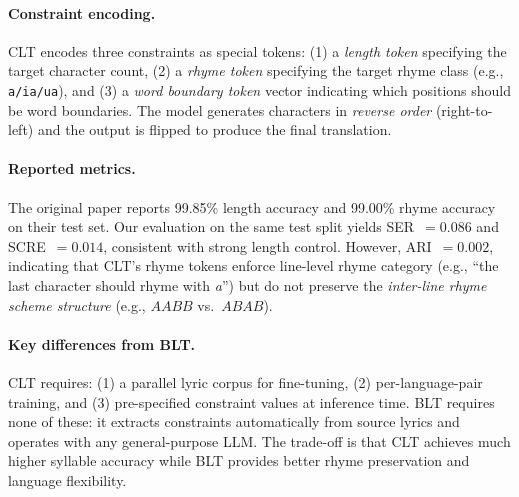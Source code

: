 \documentclass[11pt]{article}
\begin{document}
\paragraph{Constraint encoding.}
CLT encodes three constraints as special tokens: (1) a \emph{length token} specifying the target character count, (2) a \emph{rhyme token} specifying the target rhyme class (e.g., \texttt{a/ia/ua}), and (3) a \emph{word boundary token} vector indicating which positions should be word boundaries.
The model generates characters in \emph{reverse order} (right-to-left) and the output is flipped to produce the final translation.

\paragraph{Reported metrics.}
The original paper reports 99.85\% length accuracy and 99.00\% rhyme accuracy on their test set.
Our evaluation on the same test split yields SER~$= 0.086$ and SCRE~$= 0.014$, consistent with strong length control.
However, ARI~$= 0.002$, indicating that CLT's rhyme tokens enforce line-level rhyme category (e.g., ``the last character should rhyme with \textit{a}'') but do not preserve the \emph{inter-line rhyme scheme structure} (e.g., $AABB$ vs.\ $ABAB$).

\paragraph{Key differences from BLT.}
CLT requires: (1) a parallel lyric corpus for fine-tuning, (2) per-language-pair training, and (3) pre-specified constraint values at inference time.
BLT requires none of these: it extracts constraints automatically from source lyrics and operates with any general-purpose LLM.
The trade-off is that CLT achieves much higher syllable accuracy while BLT provides better rhyme preservation and language flexibility.
\end{document}
